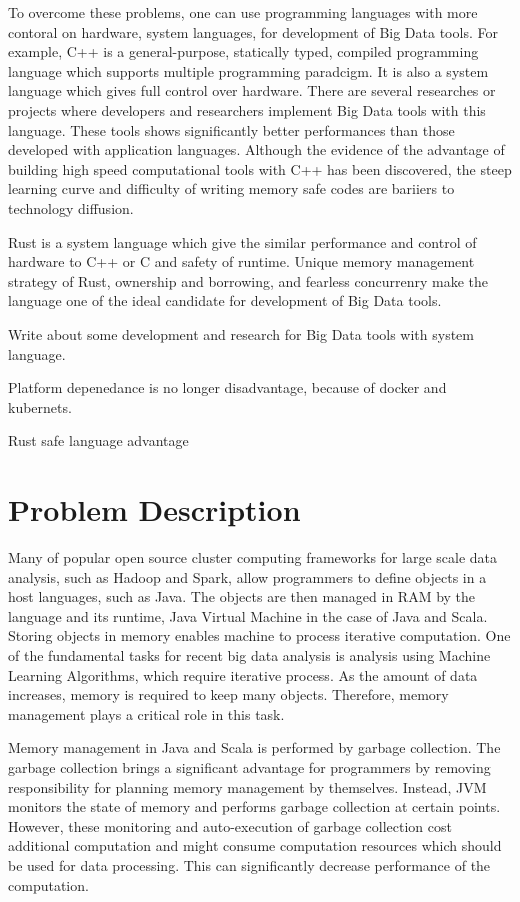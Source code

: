 To overcome these problems, one can use programming languages with more contoral on hardware, system languages, for development of Big Data tools. For example, C++ is a general-purpose, statically typed, 
compiled programming language which supports multiple programming paradcigm. It is also a system language which gives full control over hardware. There are several researches or projects where developers and 
researchers implement Big Data tools with this language. These tools shows significantly better performances than those developed with application languages. 
Although the evidence of the advantage of building high speed computational tools with C++ has been discovered, the steep learning curve and difficulty of writing memory safe codes are bariiers to technology diffusion.

Rust is a system language which give the similar performance and control of hardware to C++ or C and safety of runtime. Unique memory management strategy of Rust, ownership and borrowing, and fearless concurrenry 
make the language one of the ideal candidate for development of Big Data tools.

Write about some development and research for Big Data tools with system language. 

Platform depenedance is no longer disadvantage, because of docker and kubernets.

Rust safe language advantage






\section{Problem Description}
\label{sec:history}

Many of popular open source cluster computing frameworks for large scale data analysis, 
such as Hadoop and Spark, allow programmers to define objects in a host languages, such as Java.
The objects are then managed in RAM by the language and its runtime, Java Virtual Machine 
in the case of Java and Scala. Storing objects in memory enables machine to process iterative computation. 
One of the fundamental tasks for recent big data analysis is analysis using Machine Learning Algorithms, 
which require iterative process. As the amount of data increases, memory is required to keep many objects. 
Therefore, memory management plays a critical role in this task. 

Memory management in Java and Scala is performed by garbage collection. 
The garbage collection brings a significant advantage for programmers by removing responsibility
for planning memory management by themselves. Instead, JVM monitors the state of memory and performs garbage
collection at certain points. However, these monitoring and auto-execution of garbage collection cost additional 
computation and might consume computation resources which should be used for data processing. This can significantly decrease performance of the computation. 

